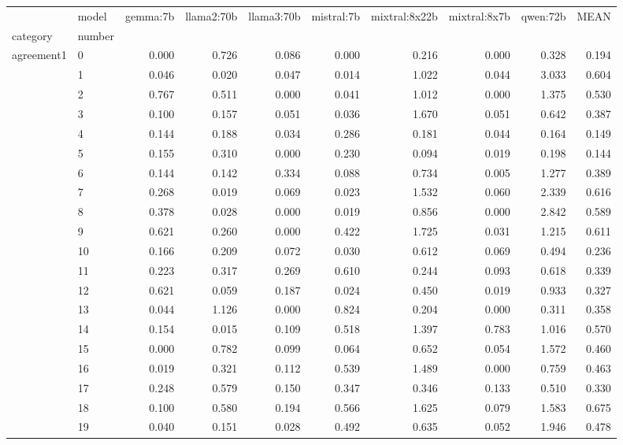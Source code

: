 \begin{table}
\label{tab:questionnaire:sosec.var}
\begin{tabular}{llrrrrrrrr}
\toprule
 & model & gemma:7b & llama2:70b & llama3:70b & mistral:7b & mixtral:8x22b & mixtral:8x7b & qwen:72b & MEAN \\
category & number &  &  &  &  &  &  &  &  \\
\midrule
\multirow[t]{23}{*}{agreement1} & 0 & 0.000 & 0.726 & 0.086 & 0.000 & 0.216 & 0.000 & 0.328 & 0.194 \\
 & 1 & 0.046 & 0.020 & 0.047 & 0.014 & 1.022 & 0.044 & 3.033 & 0.604 \\
 & 2 & 0.767 & 0.511 & 0.000 & 0.041 & 1.012 & 0.000 & 1.375 & 0.530 \\
 & 3 & 0.100 & 0.157 & 0.051 & 0.036 & 1.670 & 0.051 & 0.642 & 0.387 \\
 & 4 & 0.144 & 0.188 & 0.034 & 0.286 & 0.181 & 0.044 & 0.164 & 0.149 \\
 & 5 & 0.155 & 0.310 & 0.000 & 0.230 & 0.094 & 0.019 & 0.198 & 0.144 \\
 & 6 & 0.144 & 0.142 & 0.334 & 0.088 & 0.734 & 0.005 & 1.277 & 0.389 \\
 & 7 & 0.268 & 0.019 & 0.069 & 0.023 & 1.532 & 0.060 & 2.339 & 0.616 \\
 & 8 & 0.378 & 0.028 & 0.000 & 0.019 & 0.856 & 0.000 & 2.842 & 0.589 \\
 & 9 & 0.621 & 0.260 & 0.000 & 0.422 & 1.725 & 0.031 & 1.215 & 0.611 \\
 & 10 & 0.166 & 0.209 & 0.072 & 0.030 & 0.612 & 0.069 & 0.494 & 0.236 \\
 & 11 & 0.223 & 0.317 & 0.269 & 0.610 & 0.244 & 0.093 & 0.618 & 0.339 \\
 & 12 & 0.621 & 0.059 & 0.187 & 0.024 & 0.450 & 0.019 & 0.933 & 0.327 \\
 & 13 & 0.044 & 1.126 & 0.000 & 0.824 & 0.204 & 0.000 & 0.311 & 0.358 \\
 & 14 & 0.154 & 0.015 & 0.109 & 0.518 & 1.397 & 0.783 & 1.016 & 0.570 \\
 & 15 & 0.000 & 0.782 & 0.099 & 0.064 & 0.652 & 0.054 & 1.572 & 0.460 \\
 & 16 & 0.019 & 0.321 & 0.112 & 0.539 & 1.489 & 0.000 & 0.759 & 0.463 \\
 & 17 & 0.248 & 0.579 & 0.150 & 0.347 & 0.346 & 0.133 & 0.510 & 0.330 \\
 & 18 & 0.100 & 0.580 & 0.194 & 0.566 & 1.625 & 0.079 & 1.583 & 0.675 \\
 & 19 & 0.040 & 0.151 & 0.028 & 0.492 & 0.635 & 0.052 & 1.946 & 0.478 \\

\end{tabular}
\end{table}

